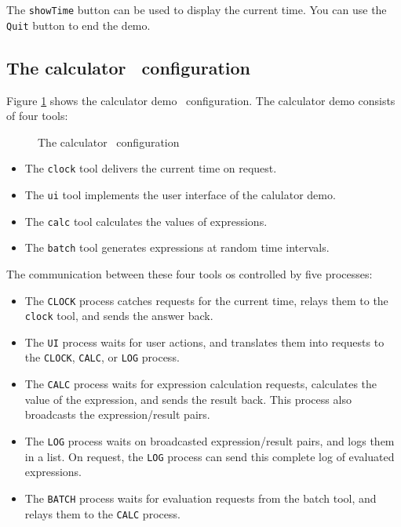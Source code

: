 The {\tt showTime} button can be used to display the current time.
You can use the {\tt Quit} button to end the demo.

\subsection{The calculator \TB\ configuration}

Figure \ref{calc-impl} shows the calculator demo \TB\ configuration.
The calculator demo consists of four tools:

\begin{figure}[htb]
\centerline{}
\caption{The calculator \TB\ configuration}
\label{calc-impl}
\end{figure}

\begin{itemize}
\item The {\tt clock} tool delivers the current time on request.
\item The {\tt ui} tool implements the user interface of the calulator demo.
\item The {\tt calc} tool calculates the values of expressions.
\item The {\tt batch} tool generates expressions at random time intervals.
\end{itemize}

The communication between these four tools os controlled by five processes:
\begin{itemize}
\item The {\tt CLOCK} process catches requests for the current time,
      relays them to the {\tt clock} tool, and sends the answer back.
\item The {\tt UI} process waits for user actions, and translates
      them into requests to the {\tt CLOCK}, {\tt CALC}, or {\tt LOG}
      process.
\item The {\tt CALC} process waits for expression calculation requests,
      calculates the value of the expression, and sends the result back.
      This process also broadcasts the expression/result pairs.
\item The {\tt LOG} process waits on broadcasted expression/result pairs,
      and logs them in a list.
      On request, the {\tt LOG} process can send this complete log of
      evaluated expressions.
\item The {\tt BATCH} process waits for evaluation requests from the
      batch tool, and relays them to the {\tt CALC} process.
\end{itemize}

